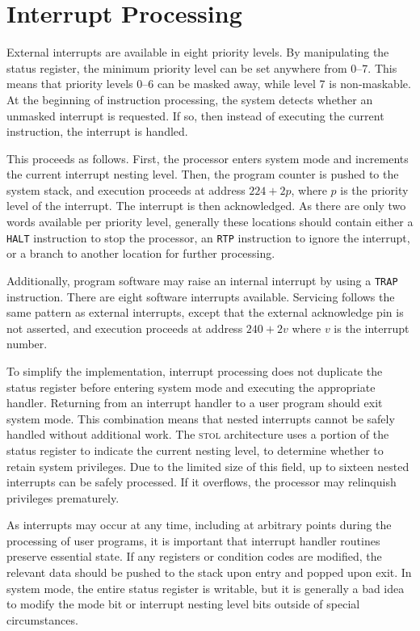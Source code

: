 \documentclass[12pt,english]{book}
\begin{document}
\section{Interrupt Processing}
External interrupts are available in eight priority levels.
By manipulating the status register,
the minimum priority level can be set anywhere from 0--7.
This means that priority levels 0--6 can be masked away,
while level 7 is non-maskable.
At the beginning of instruction processing,
the system detects whether an unmasked interrupt is requested.
If so, then instead of executing the current instruction,
the interrupt is handled.

This proceeds as follows.
First, the processor enters system mode
and increments the current interrupt nesting level.
Then, the program counter is pushed to the system stack,
and execution proceeds at address \(224+2p\),
where \(p\) is the priority level of the interrupt.
The interrupt is then acknowledged.
As there are only two words available per priority level,
generally these locations should contain
either a \texttt{HALT} instruction to stop the processor,
an \texttt{RTP} instruction to ignore the interrupt,
or a branch to another location for further processing.

Additionally, program software may raise an internal interrupt
by using a \texttt{TRAP} instruction.
There are eight software interrupts available.
Servicing follows the same pattern as external interrupts,
except that the external acknowledge pin is not asserted,
and execution proceeds at address \(240+2v\)
where \(v\) is the interrupt number.

To simplify the implementation,
interrupt processing does not duplicate the status register
before entering system mode and executing the appropriate handler.
Returning from an interrupt handler to a user program
should exit system mode.
This combination means that nested interrupts
cannot be safely handled without additional work.
The \textsc{stol} architecture uses a portion of the status register
to indicate the current nesting level,
to determine whether to retain system privileges.
Due to the limited size of this field,
up to sixteen nested interrupts can be safely processed.
If it overflows, the processor may relinquish privileges prematurely.

As interrupts may occur at any time,
including at arbitrary points during the processing of user programs,
it is important that interrupt handler routines
preserve essential state.
If any registers or condition codes are modified,
the relevant data should be pushed to the stack upon entry
and popped upon exit.
In system mode, the entire status register is writable,
but it is generally a bad idea to modify
the mode bit or interrupt nesting level bits
outside of special circumstances.
\end{document}
